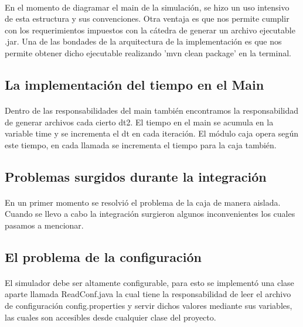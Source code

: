 \documentclass{article}
\begin{document}
\paragraph{}
En el momento de diagramar el main de la simulación, se hizo un uso intensivo de esta estructura y sus convenciones. Otra ventaja es que nos permite cumplir con los requerimientos impuestos con la cátedra de generar un archivo ejecutable .jar. Una de las bondades de la arquitectura de la implementación es que nos permite obtener dicho ejecutable realizando 'mvn clean package' en la terminal.

\subsection{La implementación del tiempo en el Main}

\paragraph{}
Dentro de las responsabilidades del main también encontramos la responsabilidad de generar archivos cada cierto dt2. El tiempo en el main se acumula en la variable time y se incrementa el dt en cada iteración. El módulo caja opera según este tiempo, en cada llamada se incrementa el tiempo para la caja también.

\subsection{Problemas surgidos durante la integración}

\paragraph{}
En un primer momento se resolvió el problema de la caja de manera aislada. Cuando se llevo a cabo la integración surgieron algunos inconvenientes los cuales pasamos a mencionar.


\subsection{El problema de la configuración}

\paragraph{}
El simulador debe ser altamente configurable, para esto se implementó una clase aparte llamada ReadConf.java la cual tiene la responsabilidad de leer el archivo de configuración config.properties y servir dichos valores mediante sus variables, las cuales son accesibles desde cualquier clase del proyecto.
\end{document}
